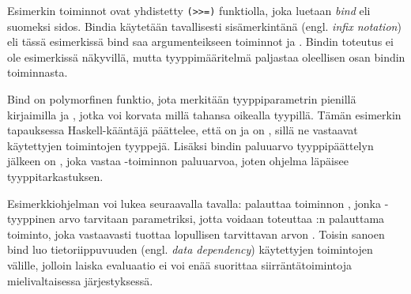 \documentclass[finnish]{tktltiki2}
\begin{document}

Esimerkin toiminnot ovat yhdistetty \verb|(>>=)| funktiolla, joka luetaan \emph{bind} eli suomeksi
sidos. Bindia käytetään tavallisesti sisämerkintänä (engl. \emph{infix notation}) eli tässä esimerkissä
bind saa argumenteikseen toiminnot  ja . Bindin toteutus ei ole
esimerkissä näkyvillä, mutta tyyppimääritelmä paljastaa oleellisen osan bindin toiminnasta.

Bind on polymorfinen funktio, jota merkitään tyyppiparametrin pienillä kirjaimilla  ja
, jotka voi korvata millä tahansa oikealla tyypillä. Tämän esimerkin tapauksessa
Haskell-kääntäjä päättelee, että  on  ja  on \code{()}, sillä ne
vastaavat käytettyjen toimintojen tyyppejä. Lisäksi bindin paluuarvo tyyppipäättelyn jälkeen on
, joka vastaa -toiminnon paluuarvoa, joten ohjelma läpäisee
tyyppitarkastuksen.

Esimerkkiohjelman voi lukea seuraavalla tavalla:  palauttaa toiminnon ,
jonka -tyyppinen arvo tarvitaan parametriksi, jotta voidaan toteuttaa :n
palauttama toiminto, joka vastaavasti tuottaa lopullisen tarvittavan arvon . Toisin
sanoen bind luo tietoriippuvuuden (engl. \emph{data dependency}) käytettyjen toimintojen välille,
jolloin laiska evaluaatio ei voi enää suorittaa siirräntätoimintoja mielivaltaisessa järjestyksessä.




\end{document}
